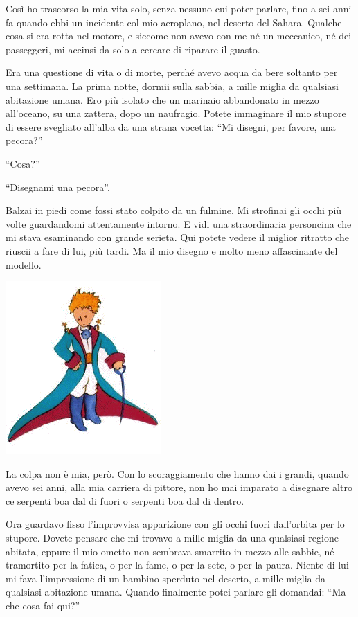 \documentclass[11pt]{scrbook}
\begin{document}
Così ho trascorso la mia vita solo, senza nessuno cui poter parlare,
fino a sei anni fa quando ebbi un incidente col mio aeroplano, nel
deserto del Sahara. Qualche cosa si era rotta nel motore, e siccome non
avevo con me né un meccanico, né dei passeggeri, mi accinsi da solo a
cercare di riparare il guasto.

Era una questione di vita o di morte, perché avevo acqua da bere
soltanto per una settimana. La prima notte, dormii sulla sabbia, a mille
miglia da qualsiasi abitazione umana. Ero più isolato che un marinaio
abbandonato in mezzo all'oceano, su una zattera, dopo un naufragio.
Potete immaginare il mio stupore di essere svegliato all'alba da una
strana vocetta: ``Mi disegni, per favore, una pecora?''

``Cosa?''

``Disegnami una pecora''.

Balzai in piedi come fossi stato colpito da un fulmine. Mi strofinai gli
occhi più volte guardandomi attentamente intorno. E vidi una
straordinaria personcina che mi stava esaminando con grande serieta. Qui
potete vedere il miglior ritratto che riuscii a fare di lui, più tardi.
Ma il mio disegno e molto meno affascinante del modello.

\begin{center}
\includegraphics{./img/retrato.png}
\end{center}

La colpa non è mia, però. Con lo scoraggiamento che hanno dai i grandi,
quando avevo sei anni, alla mia carriera di pittore, non ho mai imparato
a disegnare altro ce serpenti boa dal di fuori o serpenti boa dal di
dentro.

Ora guardavo fisso l'improvvisa apparizione con gli occhi fuori
dall'orbita per lo stupore. Dovete pensare che mi trovavo a mille miglia
da una qualsiasi regione abitata, eppure il mio ometto non sembrava
smarrito in mezzo alle sabbie, né tramortito per la fatica, o per la
fame, o per la sete, o per la paura. Niente di lui mi fava l'impressione
di un bambino sperduto nel deserto, a mille miglia da qualsiasi
abitazione umana. Quando finalmente potei parlare gli domandai: ``Ma che
cosa fai qui?''
\end{document}
